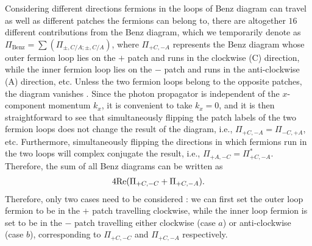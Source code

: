 \documentclass[prx,amsmath,amssymb, notitlepage, onecolumn,
nofootinbib,
superscriptaddress,
longbibliography
]{revtex4-1}
\newcommand{\beq}{\begin{eqnarray}}
\newcommand{\eeq}{\end{eqnarray}}
\newcommand{\ie}{{i.e., }}
\begin{document}
Considering different directions fermions in the loops of Benz diagram can travel as well as different patches the fermions can belong to, there are altogether $16$ different contributions from the Benz diagram, which we temporarily denote as $\Pi_\text{Benz} = \sum (\Pi_{\pm,C/A; \pm,C/A})$, 
where $\Pi_{+C, -A}$ represents the Benz diagram whose outer fermion loop lies on the $+$ patch and runs in the clockwise (C) direction, while the inner fermion loop lies on the $-$ patch and runs in the anti-clockwise (A) direction, etc. 
Unless the two fermion loops belong to the opposite patches, the diagram vanishes \cite{Sur2014,Lee2009}. 
Since the photon propagator is independent of the $x$-component momentum $k_x$, it is convenient to take $k_x=0$, and it is then straightforward to see that simultaneously flipping the patch labels of the two fermion loops does not change the result of the diagram, \ie $\Pi_{+C, -A}=\Pi_{-C, +A}$, etc. Furthermore, simultaneously flipping the directions in which fermions run in the two loops will complex conjugate the result, \ie $\Pi_{+A, -C}=\Pi^*_{+C, -A}$. 
Therefore, the sum of all Benz diagrams can be written as 
\beq\label{eq: Benz case assembling}
4{\rm Re}(\Pi_{+C, -C}+\Pi_{+C,-A}).
\eeq
Therefore, only two cases need to be considered : we can first set the outer loop fermion to be in the $+$ patch travelling clockwise, while the inner loop fermion is set to be in the $-$ patch travelling either clockwise (case $a$) or anti-clockwise (case $b$), corresponding to $\Pi_{+C, -C}$ and $\Pi_{+C, -A}$ respectively.
\end{document}
